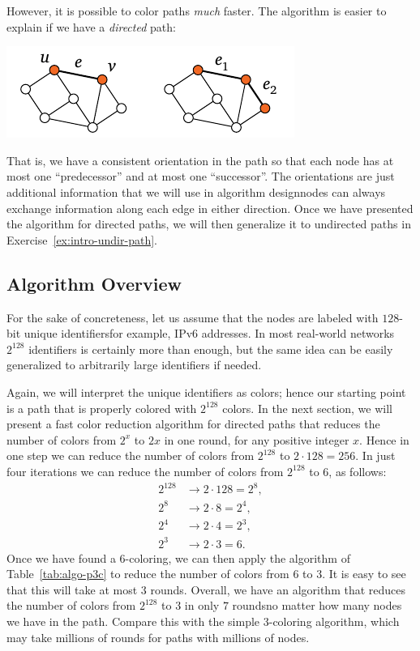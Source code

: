 However, it is possible to color paths \emph{much} faster. The algorithm is easier to explain if we have a \emph{directed} path:
\begin{center}
    \includegraphics[page=\PIntroIdDir]{figs.pdf}
\end{center}
That is, we have a consistent orientation in the path so that each node has at most one ``predecessor'' and at most one ``successor''. The orientations are just additional information that we will use in algorithm design\mydash nodes can always exchange information along each edge in either direction. Once we have presented the algorithm for directed paths, we will then generalize it to undirected paths in Exercise~\ref{ex:intro-undir-path}.


\subsection{Algorithm Overview}

For the sake of concreteness, let us assume that the nodes are labeled with $128$-bit unique identifiers\mydash for example, IPv6 addresses. In most real-world networks $2^{128}$ identifiers is certainly more than enough, but the same idea can be easily generalized to arbitrarily large identifiers if needed.

Again, we will interpret the unique identifiers as colors; hence our starting point is a path that is properly colored with $2^{128}$ colors. In the next section, we will present a fast color reduction algorithm for directed paths that reduces the number of colors from $2^x$ to $2x$ in one round, for any positive integer $x$. Hence in one step we can reduce the number of colors from $2^{128}$ to $2 \cdot 128 = 256$. In just four iterations we can reduce the number of colors from $2^{128}$ to $6$, as follows:
\begin{align*}
    2^{128} &\to 2 \cdot 128 = 2^8, \\
    2^8 &\to 2 \cdot 8 = 2^4, \\
    2^4 &\to 2 \cdot 4 = 2^3, \\
    2^3 &\to 2 \cdot 3 = 6.
\end{align*}
Once we have found a $6$-coloring, we can then apply the algorithm of Table~\ref{tab:algo-p3c} to reduce the number of colors from $6$ to $3$. It is easy to see that this will take at most $3$ rounds. Overall, we have an algorithm that reduces the number of colors from $2^{128}$ to $3$ in only $7$ rounds\mydash no matter how many nodes we have in the path. Compare this with the simple 3-coloring algorithm, which may take millions of rounds for paths with millions of nodes.


